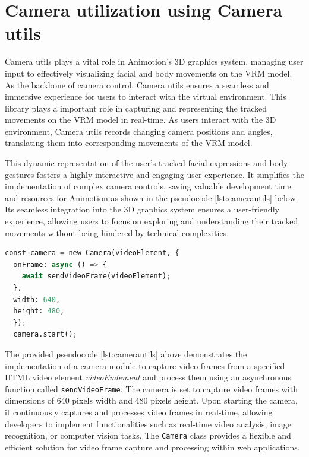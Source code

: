 \section{Camera utilization using Camera utils}
Camera utils plays a vital role in Animotion's 3D graphics system, managing user input to effectively 
visualizing facial and body movements on the VRM model. As the backbone of camera control, Camera utils 
ensures a seamless and immersive experience for users to interact with the virtual environment.
This library plays a important role in capturing and representing the tracked movements on the VRM 
model in real-time. As users interact with the 3D environment, Camera utils records changing camera 
positions and angles, translating them into corresponding movements of the VRM model. 

This dynamic representation of the user's tracked facial expressions and body gestures fosters a highly 
interactive and engaging user experience. It simplifies the implementation of complex camera controls, 
saving valuable development time and resources for Animotion as shown in the pseudocode \ref{lst:camerautils} below. Its seamless integration into the 3D 
graphics system ensures a user-friendly experience, allowing users to focus on exploring and 
understanding their tracked movements without being hindered by technical complexities. \cite{camerautils}

\begin{lstlisting}[language=Python,caption=Camera utilization using CameraUtils,label=lst:camerautils]
  const camera = new Camera(videoElement, {
  onFrame: async () => {
    await sendVideoFrame(videoElement);
  },
  width: 640,
  height: 480,
  });
  camera.start();
\end{lstlisting}

The provided pseudocode \ref{lst:camerautils} above demonstrates the implementation of a camera module to capture video frames from 
a specified HTML video element \emph{videoEmlement} and process them using an asynchronous 
function called \texttt{sendVideoFrame}. The camera is set to capture video frames 
with dimensions of 640 pixels width and 480 pixels height. Upon starting the camera, it continuously captures 
and processes video frames in real-time, allowing developers to implement functionalities such as real-time video 
analysis, image recognition, or computer vision tasks. The \texttt{Camera} class provides a flexible and efficient 
solution for video frame capture and processing within web applications.

